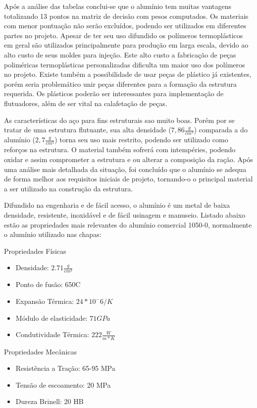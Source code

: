 Após a análise das tabelas conclui-se que o alumínio tem muitas vantagens totalizando 13 pontos na matriz de decisão com pesos computados. Os materiais com menor pontuação não serão excluídos, podendo ser utilizados em diferentes partes no projeto. Apesar de ter seu uso difundido os polímeros termoplásticos em geral são utilizados principalmente para produção em larga escala, devido ao alto custo de seus moldes para injeção. Este alto custo a fabricação de peças poliméricas termoplásticas personalizadas dificulta um maior uso dos polímeros no projeto. Existe também a possibilidade de usar peças de plástico já existentes, porém seria problemático unir peças diferentes para a formação da estrutura requerida. Os plásticos poderão ser interessantes para implementação de flutuadores, além de ser vital na calafetação de peças.

As características do aço para fins estruturais sao muito boas. Porém por se tratar de uma estrutura flutuante, sua alta densidade ($7,86 \frac{g}{cm^3}$\cite{euroaktion}) comparada a do alumínio ($2,7 \frac{g}{cm^3}$\cite{euroaktion}) torna seu uso mais restrito, podendo ser utilizado como reforços na estrutura. O material também sofrerá com intempéries, podendo oxidar e assim comprometer a estrutura e ou alterar a composição da ração. Após uma análise mais detalhada da situação, foi concluído que o alumínio se adequa de forma melhor aos requisitos iniciais de projeto, tornando-o o principal material a ser utilizado na construção da estrutura.

Difundido na engenharia e de fácil acesso, o alumínio é um metal de baixa densidade, resistente, inoxidável e de fácil usinagem e manuseio. Listado abaixo estão as propriedades\cite{aluminuin} mais relevantes do alumínio comercial 1050-0, normalmente o alumínio utilizado nas chapas:

Propriedades Físicas

\begin{itemize}
  \item Densidade: $2.71 \frac{g}{cm^3}$
  \item Ponto de fusão: 650{\degree}C
  \item Expansão Térmica: $24 * 10^-6/K$
  \item Módulo de elasticidade: $71GPa$
  \item Condutividade Térmica: $222\frac{W}{m*K}$
\end{itemize}

Propriedades Mecânicas

\begin{itemize}
  \item Resistência a Tração: 65-95 MPa
  \item Tensão de escoamento: 20 MPa
  \item Dureza Brinell: 20 HB
\end{itemize}

